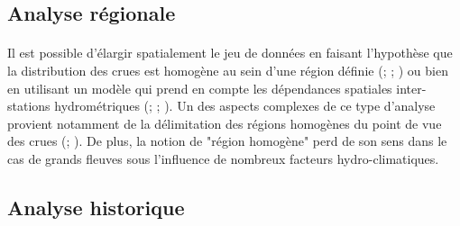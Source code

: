 \documentclass[11pt]{article}
\begin{document}
	\subsection{Analyse régionale}
	
	\paragraph{} Il est possible d'élargir spatialement le jeu de données en faisant l'hypothèse que la distribution des crues est homogène au sein d'une région définie (\citet{hosking_regional_1997}; \citet{gaume_bayesian_2010}; \citet{viglione_flood_2013}) ou bien en utilisant un modèle qui prend en compte les dépendances spatiales inter-stations hydrométriques (\citet{kjeldsen_exploratory_2009}; \citet{renard_bayesian_2011}; \citet{sun_general_2014}). Un des aspects complexes de ce type d'analyse provient notamment de la délimitation des régions homogènes du point de vue des crues (\citet{ouarda_regional_2001}; \citet{han_network_2020}). De plus, la notion de "région homogène" perd de son sens dans le cas de grands fleuves sous l'influence de nombreux facteurs hydro-climatiques.  
	
	\subsection{Analyse historique}
	
\end{document}
